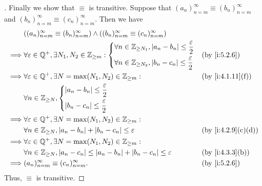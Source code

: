 \begin{proof}[]
  Finally we show that \(\equiv\) is transitive.
  Suppose that \((a_n)_{n = m}^\infty \equiv (b_n)_{n = m}^\infty\) and \((b_n)_{n = m}^\infty \equiv (c_n)_{n = m}^\infty\).
  Then we have
  \begin{align*}
             & \pa{(a_n)_{n = m}^\infty \equiv (b_n)_{n = m}^\infty} \land \pa{(b_n)_{n = m}^\infty \equiv (c_n)_{n = m}^\infty}                        \\
    \implies & \forall \varepsilon \in \Q^+, \exists N_1, N_2 \in \Z_{\geq m}: \begin{dcases}
                                                                                 \forall n \in \Z_{\geq N_1}, \abs{a_n - b_n} \leq \dfrac{\varepsilon}{2} \\
                                                                                 \forall n \in \Z_{\geq N_2}, \abs{b_n - c_n} \leq \dfrac{\varepsilon}{2}
                                                                               \end{dcases}                                    &  & \by{i:5.2.6} \\
    \implies & \forall \varepsilon \in \Q^+, \exists N = \max(N_1, N_2) \in \Z_{\geq m} :                                        &  & \by{i:4.1.11}[f]  \\
             & \forall n \in \Z_{\geq N}, \begin{dcases}
                                            \abs{a_n - b_n} \leq \dfrac{\varepsilon}{2} \\
                                            \abs{b_n - c_n} \leq \dfrac{\varepsilon}{2}
                                          \end{dcases}                                                                   \\
    \implies & \forall \varepsilon \in \Q^+, \exists N = \max(N_1, N_2) \in \Z_{\geq m} :                                                               \\
             & \forall n \in \Z_{\geq N}, \abs{a_n - b_n} + \abs{b_n - c_n} \leq \varepsilon                                     &  & \by{i:4.2.9}[c,d] \\
    \implies & \forall \varepsilon \in \Q^+, \exists N = \max(N_1, N_2) \in \Z_{\geq m} :                                                               \\
             & \forall n \in \Z_{\geq N}, \abs{a_n - c_n} \leq \abs{a_n - b_n} + \abs{b_n - c_n} \leq \varepsilon                &  & \by{i:4.3.3}[b]   \\
    \implies & (a_n)_{n = m}^\infty \equiv (c_n)_{n = m}^\infty.                                                                 &  & \by{i:5.2.6}
  \end{align*}
  Thus, \(\equiv\) is transitive.
\end{proof}

